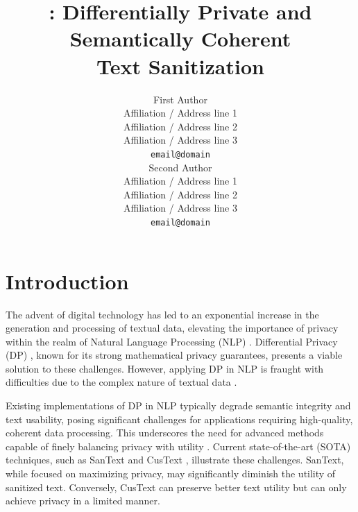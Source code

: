 \documentclass[11pt]{article}
\title{\clusant: Differentially Private and Semantically Coherent \\Text Sanitization}
\author{First Author \\
  Affiliation / Address line 1 \\
  Affiliation / Address line 2 \\
  Affiliation / Address line 3 \\
  \texttt{email@domain} \\\And
  Second Author \\
  Affiliation / Address line 1 \\
  Affiliation / Address line 2 \\
  Affiliation / Address line 3 \\
  \texttt{email@domain} \\}
\begin{document}
\maketitle








\section{Introduction}

The advent of digital technology has led to an exponential increase in the generation and processing of textual data, elevating the importance of privacy within the realm of Natural Language Processing (NLP) \cite{carlini2021extracting, jegorova2022survey}.  
Differential Privacy (DP) \cite{dwork2006differential}, known for its strong mathematical privacy guarantees, presents a viable solution to these challenges. However, applying DP in NLP is fraught with difficulties due to the complex nature of textual data %
\cite{song2020information}.

Existing implementations of DP in NLP typically degrade semantic integrity and text usability, posing significant challenges for applications requiring high-quality, coherent data processing. This underscores the need for advanced methods capable of finely balancing privacy with utility \cite{lyu2020towards,anil2021large,dupuy2022efficient, li2018towards,mireshghallah2021privacy}. 
Current state-of-the-art (SOTA) techniques, such as SanText \cite{yue2021differential} and CusText \cite{chen2023customized}, illustrate these challenges. SanText, while focused on maximizing privacy, may significantly diminish the utility of sanitized text. Conversely, CusText can preserve better text utility  but can only achieve privacy in a limited manner. 

\end{document}
